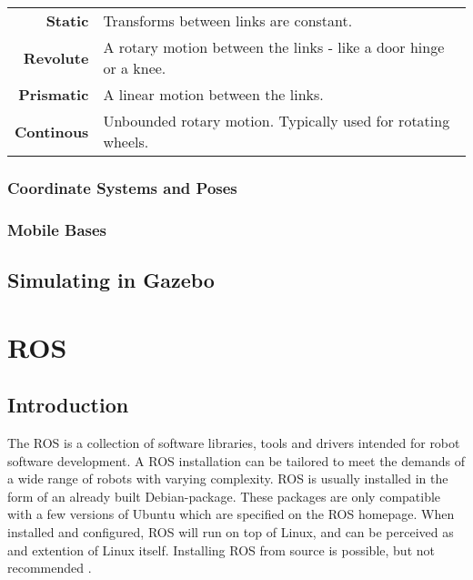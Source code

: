 \begin{center}
	\begin{tabular}{ r p{10cm} }
	\textbf{Static} & Transforms between links are constant.\\
	\textbf{Revolute} &  A rotary motion between the links - like a door hinge or a knee.\\
	\textbf{Prismatic} & A linear motion between the links. \\
	\textbf{Continous} & Unbounded rotary motion. Typically used for rotating wheels. \\
	\end{tabular}
\end{center}

\subsubsection{Coordinate Systems and Poses}

\subsubsection{Mobile Bases}



\subsection{Simulating in Gazebo}

\section{ROS}
\label{sec:ros}
\subsection{Introduction}

The \ac{ROS} is a collection of software libraries, tools and drivers intended for robot software development. A \ac{ROS} installation can be tailored to meet the demands of a wide range of robots with varying complexity. \ac{ROS} is usually installed in the form of an already built Debian-package. These packages are only compatible with a few versions of Ubuntu which are specified on the \ac{ROS} homepage. When installed and configured, \ac{ROS} will run on top of Linux, and can be perceived as and extention of Linux itself. Installing \ac{ROS} from source is possible, but not recommended \cite{ROS_install}.

